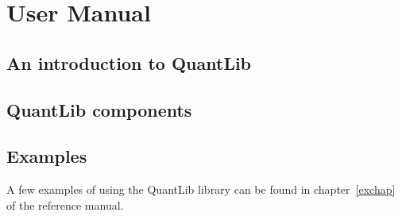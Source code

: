 
\hypertarget{usermanual}{}\part{User Manual}\label{usermanual}

\hypertarget{qlintro}{}\chapter{An introduction to QuantLib}\label{qlintro}










\hypertarget{frameworks}{}\chapter{QuantLib components}\label{components}












\hypertarget{exlink}{}\chapter{Examples}\label{exlink}
A few examples of using the QuantLib library can be found in
chapter~\ref{exchap} of the reference manual.
